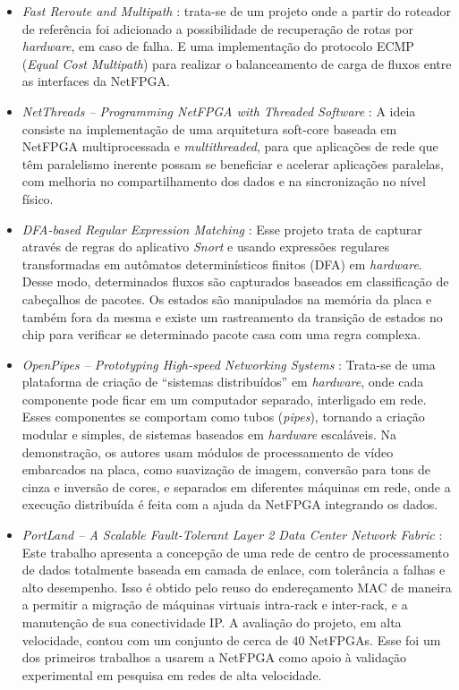 \begin{itemize}

\item \textit{Fast Reroute and Multipath} \cite{multipath}: trata-se de
um projeto onde a partir do roteador de referência foi adicionado a
possibilidade de recuperação de rotas por \emph{hardware}, em caso de
falha. E uma implementação do protocolo ECMP (\emph{Equal Cost
Multipath}) para realizar o balanceamento de carga de fluxos entre as
interfaces da NetFPGA.

\item \textit{NetThreads -- Programming NetFPGA with Threaded Software}
\cite{6645624}: A ideia consiste na implementação de uma arquitetura
soft-core baseada em NetFPGA multiprocessada e \emph{multithreaded},
para que aplicações de rede que têm paralelismo inerente possam se
beneficiar e acelerar aplicações paralelas, com melhoria no
compartilhamento dos dados e na sincronização no nível físico.

\item \textit{DFA-based Regular Expression Matching} \cite{dfa}: Esse
projeto trata de capturar através de regras do aplicativo \textit{Snort}
e usando expressões regulares transformadas em autômatos determinísticos
finitos (DFA) em \textit{hardware}. Desse modo, determinados fluxos são
capturados baseados em classificação de cabeçalhos de pacotes. Os
estados são manipulados na memória da placa e também fora da mesma e
existe um rastreamento da transição de estados no chip para verificar se
determinado pacote casa com uma regra complexa.

\item \textit{OpenPipes -- Prototyping High-speed Networking Systems}
\cite{openpipes}: Trata-se de uma plataforma de criação de ``sistemas
distribuídos'' em \textit{hardware}, onde cada componente pode ficar em
um computador separado, interligado em rede. Esses componentes se
comportam como tubos (\textit{pipes}), tornando a criação modular e
simples, de sistemas baseados em \textit{hardware} escaláveis. Na
demonstração, os autores usam módulos de processamento de vídeo
embarcados na placa, como suavização de imagem, conversão para tons de
cinza e inversão de cores, e separados em diferentes máquinas em rede,
onde a execução distribuída é feita com a ajuda da NetFPGA integrando os
dados.

\item \textit{PortLand -- A Scalable Fault-Tolerant Layer 2 Data Center
Network Fabric} \cite{NiranjanMysore:2009:PSF:1592568.1592575}: Este
trabalho apresenta a concepção de uma rede de centro de processamento de
dados totalmente baseada em camada de enlace, com tolerância a falhas e
alto desempenho. Isso é obtido pelo reuso do endereçamento MAC de
maneira a permitir a migração de máquinas virtuais intra-rack e
inter-rack, e a manutenção de sua conectividade IP. A avaliação do
projeto, em alta velocidade, contou com um conjunto de cerca de 40
NetFPGAs. Esse foi um dos primeiros trabalhos a usarem a NetFPGA como
apoio à validação experimental em pesquisa em redes de alta velocidade.


\end{itemize}
